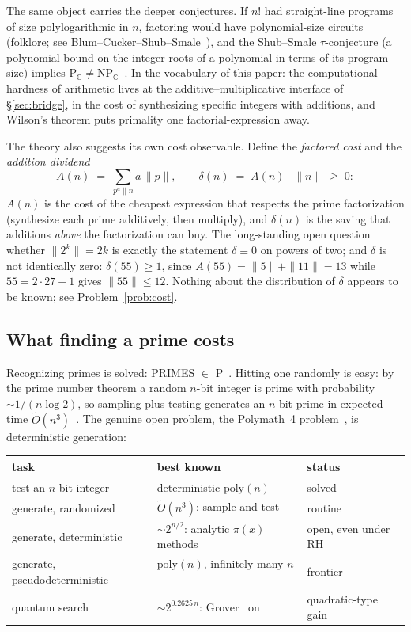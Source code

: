 \documentclass[11pt]{article}
\numberwithin{equation}{section}
\theoremstyle{plain}
\theoremstyle{definition}
\theoremstyle{remark}
\begin{document}
The same object carries the deeper conjectures. If $n!$ had straight-line programs of
size polylogarithmic in $n$, factoring would have polynomial-size circuits (folklore;
see Blum--Cucker--Shub--Smale~\cite{bcss}), and the Shub--Smale $\tau$-conjecture
(a polynomial bound on the integer roots of a polynomial in terms of its program
size) implies $\mathrm{P}_{\mathbb C} \neq \mathrm{NP}_{\mathbb C}$~\cite{shubsmale}.
In the vocabulary of this paper: the computational hardness of arithmetic lives at
the additive--multiplicative interface of \S\ref{sec:bridge}, in the cost of
synthesizing specific integers with additions, and Wilson's theorem puts primality
one factorial-expression away.

The theory also suggests its own cost observable. Define the \emph{factored cost} and
the \emph{addition dividend}
\[
A(n) \;=\; \sum_{p^a \parallel n} a\,\|p\|,
\qquad
\delta(n) \;=\; A(n) - \|n\| \;\ge\; 0:
\]
$A(n)$ is the cost of the cheapest expression that respects the prime factorization
(synthesize each prime additively, then multiply), and $\delta(n)$ is the saving that
additions \emph{above} the factorization can buy. The long-standing open question
whether $\|2^k\| = 2k$ is exactly the statement $\delta \equiv 0$ on powers of two;
and $\delta$ is not identically zero: $\delta(55) \ge 1$, since
$A(55) = \|5\| + \|11\| = 13$ while $55 = 2 \cdot 27 + 1$ gives $\|55\| \le 12$.
Nothing about the distribution of $\delta$ appears to be known; see
Problem~\ref{prob:cost}.

\subsection{What finding a prime costs}\label{sec:costlandscape}

Recognizing primes is solved:
PRIMES $\in$ P~\cite{aks}. Hitting one randomly is easy: by the prime number
theorem a random $n$-bit integer is prime with probability $\sim 1/(n \log 2)$, so
sampling plus testing generates an $n$-bit prime in expected time
$\widetilde{O}(n^3)$~\cite{crandallpomerance}. The genuine open problem, the
Polymath~4 problem~\cite{polymath}, is deterministic generation:

\begin{center}\small
\begin{tabular}{@{}lll@{}}
\toprule
task & best known & status \\
\midrule
test an $n$-bit integer & deterministic $\mathrm{poly}(n)$~\cite{aks} & solved \\
generate, randomized & $\widetilde O(n^3)$: sample and test & routine \\
generate, deterministic & $\sim 2^{n/2}$: analytic $\pi(x)$ methods~\cite{polymath} & open, even under RH \\
generate, pseudodeterministic & $\mathrm{poly}(n)$, infinitely many $n$~\cite{chenluors} & frontier \\
quantum search & $\sim 2^{0.2625\,n}$: Grover~\cite{grover} on~\cite{bhp} & quadratic-type gain \\
\bottomrule
\end{tabular}
\end{center}
\end{document}
